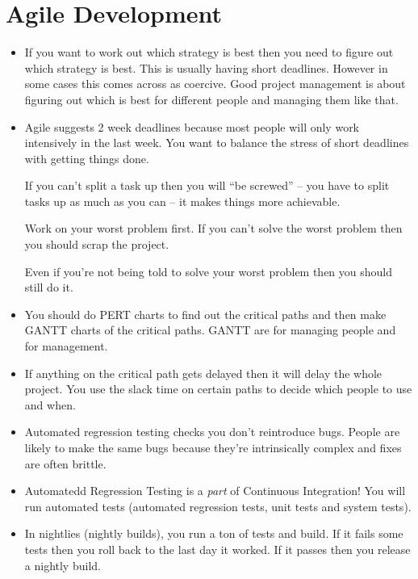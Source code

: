 \documentclass[10pt, a4paper]{article}
\begin{document}
\section{Agile Development}

\begin{itemize}

\item If you want to work out which strategy is best then you need to figure out which
strategy is best. This is usually having short deadlines. However in some cases this
comes across as coercive. Good project management is about figuring out which is
best for different people and managing them like that.

\item Agile suggests 2 week deadlines because most people will only work intensively in the
last week. You want to balance the stress of short deadlines with getting things
done.

If you can't split a task up then you will ``be screwed'' -- you have to split tasks
up as much as you can -- it makes things more achievable.

Work on your worst problem first. If you can't solve the worst problem then
you should scrap the project.

Even if you're not being told to solve your worst problem then you should still
do it.

\item You should do PERT charts to find out the critical paths and then
make GANTT charts of the critical paths. GANTT are for managing people and for
management.

\item If anything on the critical path gets delayed then it will delay the whole
project. You use the slack time on certain paths to decide which people
to use and when.

\item Automated regression testing checks you don't reintroduce bugs. People are
likely to make the same bugs because they're intrinsically complex and fixes
are often brittle.

\item Automatedd Regression Testing is a \textit{part} of Continuous Integration!
You will run automated tests (automated regression tests, unit tests and system tests).

\item In nightlies (nightly builds), you run a ton of tests and build. If it fails
some tests then you roll back to the last day it worked. If it passes then you release
a nightly build.


\end{itemize}
\end{document}
